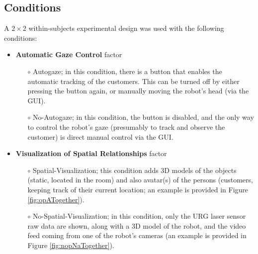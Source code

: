 \documentclass[journal]{IEEEtran}
\begin{document}
\subsection{Conditions}
\label{subsec:conditions}
A $2\times2$ within-subjects experimental design was used with the following conditions:
\begin{itemize}
  \item {\bf Automatic Gaze Control} factor
  \begin{itemize}
    \item[$\circ$] Autogaze; in this condition, there is a button that enables the automatic tracking of the customers.
    This can be turned off by either pressing the button again, or manually moving the robot's head (via the GUI).
    \item[$\circ$] No-Autogaze; in this condition, the button is disabled, and the only way to control the robot's gaze (presumably to track and observe the customer) is direct manual control via the GUI.
  \end{itemize}
  \item {\bf Visualization of Spatial Relationships} factor
  \begin{itemize}
    \item[$\circ$] Spatial-Visualization; this condition adds 3D models of the objects (static, located in the room) and also avatar(s) of the persons (customers, keeping track of their current location; an example is provided in Figure \ref{fig:opATogether}).
    \item[$\circ$] No-Spatial-Visualization; in this condition, only the URG laser sensor raw data are shown, along with a 3D model of the robot, and the video feed coming from one of the robot's cameras (an example is provided in Figure \ref{fig:nopNaTogether}).
  \end{itemize}
\end{itemize}
\end{document}
